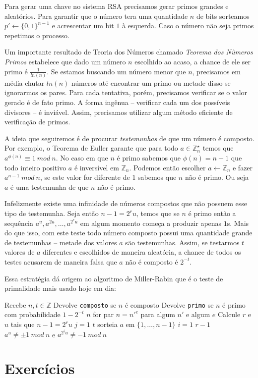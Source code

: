 Para gerar uma chave no sistema RSA precisamos gerar primos grandes e aleatórios.
Para garantir que o número tera uma quantidade $n$ de bits sorteamos $p' \leftarrow \{0,1\}^{n-1}$ e acrescentar um bit $1$ à esquerda.
Caso o número não seja primos repetimos o processo.

Um importante resultado de Teoria dos Números chamado {\em Teorema dos Nùmeros Primos} estabelece que dado um número $n$ escolhido ao acaso, a chance de ele ser primo é $\frac{1}{ln(n)}$.
Se estamos buscando um número menor que $n$, precisamos em média chutar $ln(n)$ números até encontrar um primo ou metade disso se ignorarmos os pares.
Para cada tentativa, porém, precisamos verificar se o valor gerado é de fato primo.
A forma ingênua -- verificar cada um dos possíveis divisores -- é inviável.
Assim, precisamos utilizar algum método eficiente de verificação de primos.

A ideia que seguiremos é de procurar {\em testemunhas} de que um número é composto.
Por exemplo, o Teorema de Euller garante que para todo $a \in \mathbb{Z}_n^\star$ temos que $a^{\phi(n)} \equiv 1\ mod\ n$.
No caso em que $n$ é primo sabemos que $\phi(n) = n - 1$ que todo inteiro positivo $a$ é inversível em $\mathbb{Z}_n$.
Podemos então escolher $a \leftarrow \mathbb{Z}_n$ e fazer $a^{n-1}\ mod\ n$, se este valor for diferente de $1$ sabemos que $n$ não é primo.
Ou seja $a$ é uma testemunha de que $n$ não é primo.

Infelizmente existe uma infinidade de números compostos que não possuem esse tipo de testemunha.
Seja então $n - 1 = 2^ru$, temos que se $n$ é primo então a sequência $a^u, a^{2u}, \dots, a^{2^ru}$ em algum momento começa a produzir apenas $1$s.
Mais do que isso, com este teste todo número composto possui uma quantidade grande de testemunhas -- metade dos valores $a$ são testemunhas.
Assim, se testarmos $t$ valores de $a$ diferentes e escolhidos de maneira aleatória, a chance de todos os testes acusarem de maneira falsa que $a$ não é composto é $2^{-t}$.

Essa estratégia dá origem ao algoritmo de Miller-Rabin \cite{Miller75,Rabin80} que é o teste de primalidade mais usado hoje em dia:

\begin{codebox}
\li \Comment Recebe $n, t \in \mathbb{Z}$
\li \Comment Devolve {\tt composto} se $n$ é composto
\li \Comment Devolve {\tt primo} se $n$ é primo com probabilidade $1 - 2^{-t}$
\li \If $n$ for par
\li   \Then {}
    \End
\li \If $n = n'^e$ para algum $n'$ e algum $e$
\li   \Then {}
    \End
\li  Calcule $r$ e $u$ tais que $n-1 = 2^ru$
\li \For $j = 1$ \To $t$
\li   \Do sorteia $a$ em $\{1, \dots, n-1\}$ 
\li   \For $i = 1$ \To $r-1$
\li     \Do \If $a^u \neq \pm 1\ mod\ n$ e $a^{2^iu} \neq -1\ mod\ n$
\li         \Then {}
            \End
      \End
    \End
\li {}
\end{codebox}

\section{Exercícios}
\label{sec:exercicios}


\begin{exercicio}
\end{exercicio}

